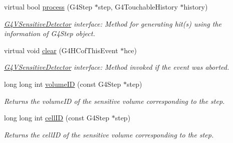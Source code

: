 \begin{DoxyCompactItemize}
virtual bool \hyperlink{class_d_d4hep_1_1_simulation_1_1_geant4_sensitive_a9a9463a6c29a66dad43a52ffc9f7838d}{process} (G4Step $\ast$step, G4TouchableHistory $\ast$history)
\begin{DoxyCompactList}\small\item\em \hyperlink{class_g4_v_sensitive_detector}{G4VSensitiveDetector} interface: Method for generating hit(s) using the information of G4Step object. \item\end{DoxyCompactList}\item 
virtual void \hyperlink{class_d_d4hep_1_1_simulation_1_1_geant4_sensitive_a3bb1c2f79261a98e83ec22102281d117}{clear} (G4HCofThisEvent $\ast$hce)
\begin{DoxyCompactList}\small\item\em \hyperlink{class_g4_v_sensitive_detector}{G4VSensitiveDetector} interface: Method invoked if the event was aborted. \item\end{DoxyCompactList}\item 
long long int \hyperlink{class_d_d4hep_1_1_simulation_1_1_geant4_sensitive_a9aa1270e3fb490a4ebe511343903d72f}{volumeID} (const G4Step $\ast$step)
\begin{DoxyCompactList}\small\item\em Returns the volumeID of the sensitive volume corresponding to the step. \item\end{DoxyCompactList}\item 
long long int \hyperlink{class_d_d4hep_1_1_simulation_1_1_geant4_sensitive_a1e79173455ccff4d70cd1325b26ad3e9}{cellID} (const G4Step $\ast$step)
\begin{DoxyCompactList}\small\item\em Returns the cellID of the sensitive volume corresponding to the step. \item\end{DoxyCompactList}\end{DoxyCompactItemize}
